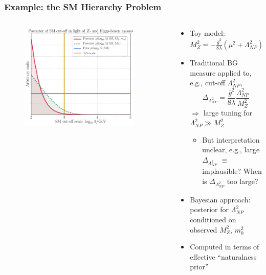 \documentclass[10pt,aspectratio=169]{beamer}
\begin{document}
\begin{frame}
  \frametitle{Example: the SM Hierarchy Problem}
  \begin{columns}[t]
    \begin{column}{0.5\textwidth}
      \begin{figure}
        \includegraphics[width=0.9\textwidth]{SM_Lambda}
      \end{figure}
    \end{column}
    \begin{column}{0.5\textwidth}
      \begin{itemize} \itemsep1em
      \item Toy model: $M_Z^2 = -\frac{\bar{g}^2}{8 \lambda} (\mu^2
        + \Lambda_{NP}^2)$
      \item Traditional BG measure applied to, e.g., cut-off $\Lambda_{NP}^2$,
        \begin{equation*}
          \Delta_{\Lambda_{NP}^2} = \frac{\bar{g}^2}{8 \lambda}
          \frac{\Lambda_{NP}^2}{M_Z^2}
        \end{equation*}
        $\Rightarrow$ large tuning for $\Lambda_{NP}^2 \gg M_Z^2$
        \begin{itemize}
        \item But interpretation unclear, e.g., large $\Delta_{\Lambda_{NP}^2}$
          $\equiv$ implausible? When is $\Delta_{\Lambda_{NP}^2}$ too large?
        \end{itemize}
      \item Bayesian approach: posterior for $\Lambda_{NP}^2$ conditioned on
        observed $M_Z^2$, $m_h^2$
      \item Computed in terms of effective ``naturalness prior''
      \end{itemize}
    \end{column}
  \end{columns}
\end{frame}
\end{document}
